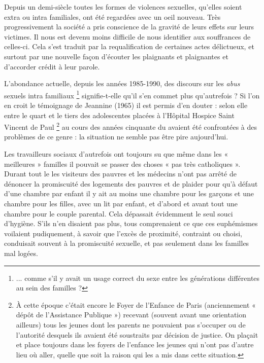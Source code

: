 Depuis un demi-siècle toutes les formes de violences sexuelles, qu'elles soient extra ou intra familiales, ont été regardées avec un oeil nouveau. Très progressivement la société a pris conscience de la gravité de leurs effets sur leurs victimes. Il nous est devenu moins difficile de nous identifier aux souffrances de celles-ci. Cela s'est traduit par la requalification de certaines actes délictueux, et surtout par une nouvelle façon d'écouter les plaignants et plaignantes et d'accorder crédit à leur parole.  
 


 L'abondance actuelle, depuis les années 1985-1990, des discours sur les \emph{abus} sexuels intra familiaux 
\footnote{... comme s'il y avait un usage correct du sexe entre les générations différentes au sein des familles ?} 
signifie-t-elle qu'il s'en commet plus qu'autrefois ? Si l'on en croit le témoignage de Jeannine  (1965) il est permis d'en douter : selon elle entre le quart et le tiers des adolescentes placées à l'Hôpital Hospice Saint Vincent de Paul%
\footnote{À cette époque c'était encore le Foyer de l'Enfance de Paris (anciennement « dépôt de l'Assistance Publique ») recevant (souvent avant une orientation ailleurs) tous les jeunes dont les parents ne pouvaient pas s'occuper ou de l'autorité desquels ils avaient été soustraits par décision de justice. On plaçait et place toujours dans les foyers de l'enfance les jeunes qui n'ont pas d'autre lieu où aller, quelle que soit la raison qui les a mis dans cette situation.} 
 au cours des années cinquante du  avaient été confrontées à des problèmes de ce genre : la situation ne semble pas être pire aujourd'hui. 

 Les travailleurs sociaux d'autrefois ont toujours su que même dans les « meilleures » familles il pouvait se passer des choses « pas très catholiques ». Durant tout le  les visiteurs des pauvres et les médecins n'ont pas arrêté de dénoncer la promiscuité des logements des pauvres et de plaider pour qu'à défaut d'une chambre par enfant il y ait au moins une chambre pour les garçons et une chambre pour les filles, avec un lit par enfant, et d'abord et avant tout une chambre pour le couple parental. Cela dépassait évidemment le seul souci d'hygiène. S'ils n'en disaient pas plus, tous comprenaient ce que ces euphémismes voilaient pudiquement, à savoir que l'excès de proximité, contraint ou choisi, conduisait souvent à la promiscuité sexuelle, et pas seulement dans les familles mal logées. 
 
